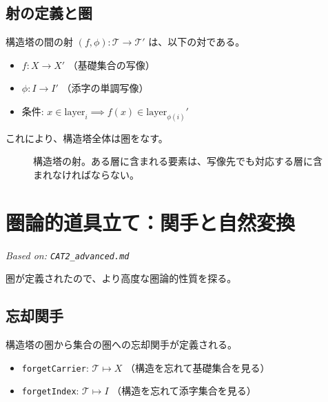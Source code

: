 \documentclass[a4paper,11pt]{ltjsarticle}
\theoremstyle{definition}
\newcommand{\Tower}{\mathcal{T}}
\newcommand{\Layer}[1]{\mathrm{layer}_{#1}}
\begin{document}
\subsection{射の定義と圏}
構造塔の間の射 $(f, \phi): \Tower \to \Tower'$ は、以下の対である。
\begin{itemize}
    \item $f: X \to X'$ （基礎集合の写像）
    \item $\phi: I \to I'$ （添字の単調写像）
    \item 条件: $x \in \Layer{i} \implies f(x) \in \Layer{\phi(i)}'$
\end{itemize}
これにより、構造塔全体は圏をなす。

\begin{figure}[h]
\centering
{}
\caption{構造塔の射。ある層に含まれる要素は、写像先でも対応する層に含まれなければならない。}
\end{figure}

\section{圏論的道具立て：関手と自然変換}
\label{sec:cat2_advanced}
\textit{Based on: \texttt{CAT2\_advanced.md}}

圏が定義されたので、より高度な圏論的性質を探る。

\subsection{忘却関手}
構造塔の圏から集合の圏への忘却関手が定義される。
\begin{itemize}
    \item \texttt{forgetCarrier}: $\Tower \mapsto X$ （構造を忘れて基礎集合を見る）
    \item \texttt{forgetIndex}: $\Tower \mapsto I$ （構造を忘れて添字集合を見る）
\end{itemize}
\end{document}
